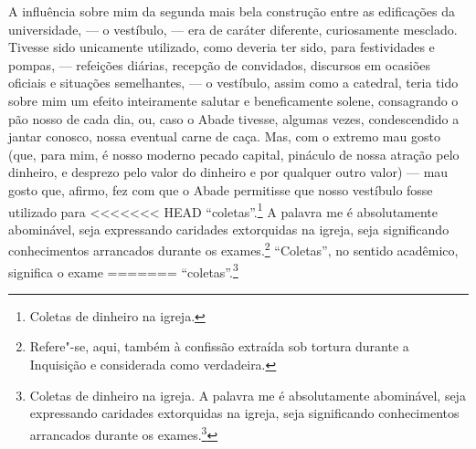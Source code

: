 {{{{{{{{{{{{{{{{{{{{{{{{{{{{{{{{{{{{{{{{{{{{{{{{{{{{{{{{{{{{{{{{{{{{{{{{{{{{{{{{{{{{{{{{{{{{{%
A influência sobre mim da segunda mais bela construção entre as
edificações da universidade, --- o vestíbulo, --- era de caráter
diferente, curiosamente mesclado. Tivesse sido unicamente utilizado,
como deveria ter sido, para festividades e pompas, --- refeições diárias,
recepção de convidados, discursos em ocasiões oficiais e situações
semelhantes, --- o vestíbulo, assim como a catedral, teria tido sobre mim
um efeito inteiramente salutar e beneficamente solene, consagrando o pão
nosso de cada dia, ou, caso o Abade tivesse, algumas vezes,
condescendido a jantar conosco, nossa eventual carne de caça. Mas, com o
extremo mau gosto (que, para mim, é nosso moderno pecado capital,
pináculo de nossa atração pelo dinheiro, e desprezo pelo valor do
dinheiro e por qualquer outro valor) --- mau gosto que, afirmo, fez com
que o Abade permitisse que nosso vestíbulo fosse utilizado para
<<<<<<< HEAD
``coletas''.\footnote{Coletas de dinheiro na igreja.} A
palavra me é absolutamente abominável, seja expressando caridades
extorquidas na igreja, seja significando conhecimentos arrancados
durante os exames.\footnote{Refere"-se, aqui, também à confissão extraída
  sob tortura durante a Inquisição e considerada como verdadeira.} ``Coletas'', no sentido acadêmico, significa o exame
=======
``coletas''.\footnote{Coletas de dinheiro na igreja.  A
palavra me é absolutamente abominável, seja expressando caridades
extorquidas na igreja, seja significando conhecimentos arrancados
durante os exames.\footnote{Refere"-se, aqui, também à confissão extraída
  sob tortura durante a Inquisição e considerada como verdadeira.  ``Coletas'', no sentido acadêmico, significa o exame
>>>>>>> 7ef31cc2a6d5603f856fee4c85bc83700040648c
realizado ao fim de cada trimestre na universidade, no qual o Abade
demonstra seu péssimo gosto, ao desempenhar o papel de nosso inquisidor,
embora nunca tenha estado presente em nossa mesa como anfitrião.
Naturalmente, a soma dos conhecimentos de grego existentes nas mentes de
todos os estudantes da graduação presentes no vestíbulo era, para
\textit{ele}, infinitesimal. A princípio desdenhoso, e vingativo, sempre
trovejante, mais rabugento e ameaçador à medida que o dia avançava,
caminhava com terrível glacialidade gorgônia do estrado à porta, da
porta ao estrado, pela majestosa câmara de tortura, --- vasta como o
grande vestíbulo do conselho de Veneza, mas agora degradada pelo terror
de lastimáveis criaturas sem direito à opinião, que, assustadas como
andorinhas sob beirais, nada podiam fazer, exceto esconder suas colas a
cada passagem fatal do Abade. Claro que \textit{eu} nunca colei, mas creio
}}}}}}}}}}}}}}}}}}}}}}}}}}}}}}}}}}}}}}}}}}}}}}}}}}}}}}}}}}}}}}}}}}}}}}}}}}}}}}}}}}}}}}}}}}}}}}}

